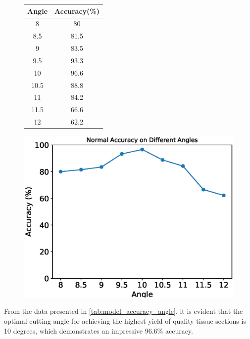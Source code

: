 \begin{figure}[htbp]
    \centering
    \begin{minipage}{0.4\textwidth}
        \centering
        \begin{tabular}{cc}
            \toprule
            Angle & Accuracy(\%) \\
            \midrule
            8 & 80 \\
            8.5 & 81.5 \\
            9 & 83.5 \\
            9.5 & 93.3 \\
            10 & 96.6 \\
            10.5 & 88.8 \\
            11 & 84.2 \\
            11.5 & 66.6 \\
            12 & 62.2 \\
            \bottomrule
        \end{tabular}
        \label{tab:model_accuracy_angle}
    \end{minipage}
    \begin{minipage}{0.55\textwidth}
        \centering
        \includegraphics[width=\textwidth]{./fig/assistplot/angle_accuracy.eps}
        \label{fig:angle_accuracy_histogram}
    \end{minipage}
\end{figure}

From the data presented in \autoref{tab:model_accuracy_angle}, it is evident that the optimal cutting angle for achieving the highest yield of quality tissue sections is 10 degrees, which demonstrates an impressive 96.6\% accuracy.

